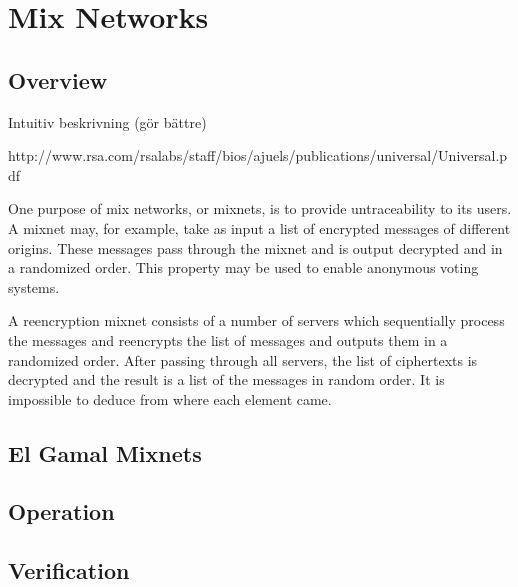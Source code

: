 \section{Mix Networks}



\subsection{Overview}

Intuitiv beskrivning (gör bättre)

http://www.rsa.com/rsalabs/staff/bios/ajuels/publications/universal/Universal.pdf

One purpose of mix networks, or mixnets, is to provide untraceability
to its users. A mixnet may, for example, take as input a list of
encrypted messages of different origins. These messages pass through
the mixnet and is output decrypted and in a randomized order. This
property may be used to enable anonymous voting systems.

A reencryption mixnet consists of a number of servers which
sequentially process the messages and reencrypts the list of messages
and outputs them in a randomized order. After passing through all
servers, the list of ciphertexts is decrypted and the result is a list
of the messages in random order. It is impossible to deduce from where
each element came.

\subsection{El Gamal Mixnets}



\subsection{Operation}

\subsection{Verification}
